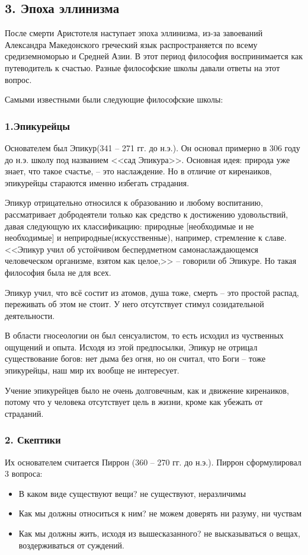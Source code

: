 \documentclass[a4paper, 12pt]{article} %
\begin{document}
\subsection*{3. Эпоха эллинизма}
После смерти Аристотеля наступает эпоха эллинизма, из-за завоеваний Александра Македонского греческий язык распространяется по всему средиземноморью и Средней Азии. В этот период философия воспринимается как путеводитель к счастью. Разные философские школы давали ответы на этот вопрос.

Самыми известными были следующие философские школы:

\subsubsection*{1.Эпикурейцы}
Основателем был Эпикур(341 -- 271 гг. до н.э.). Он основал примерно в 306 году до н.э. школу под названием <<сад Эпикура>>. Основная идея: природа уже знает, что такое счастье, -- это наслаждение. Но в отличие от киренаиков, эпикурейцы стараются именно избегать страдания. 

Эпикур отрицательно относился к образованию и любому воспитанию, рассматривает добродеятели только как средство к достижению удовольствий, давая следующую их классификацию:
природные [необходимые и не необходимые] и неприродные(искусственные), например, стремление к славе. <<Эпикур учил об устойчивом беспердметном самонаслаждающемся человеческом организме, взятом как целое,>> -- говорили об Эпикуре. Но такая философия была не для всех. 

Эпикур учил, что всё состит из атомов, душа тоже, смерть -- это простой распад, переживать об этом не стоит. У него отсутствует стимул созидательной деятельности. 

В области гносеологии он был сенсуалистом, то есть исходил из чуственных ощущений и опыта. Исходя из этой предпосылки, Эпикур не отрицал существование богов: нет дыма без огня, но он считал, что Боги -- тоже эпикурейцы, наш мир их вообще не интересует.

Учение эпикурейцев было не очень долговечным, как и движение киренаиков, потому что у человека отсутствует цель в жизни, кроме как убежать от страданий.

\subsubsection*{2. Скептики	}
Их основателем считается Пиррон (360 -- 270 гг. до н.э.). Пиррон сформулировал 3 вопроса:
\begin{itemize}
\item В каком виде существуют вещи? не существуют, неразличимы
\item Как мы должны относиться к ним?  не можем доверять ни разуму, ни чуствам
\item Как мы должны жить, исходя из вышесказанного? не высказываться о вещах, воздерживаться от суждений. 
\end{itemize}
\end{document}

